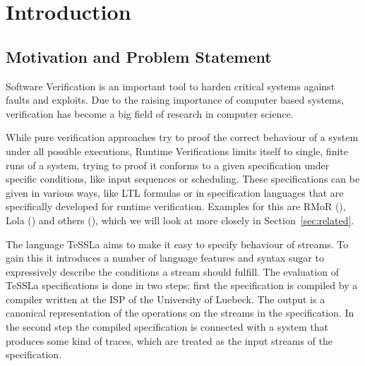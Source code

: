 %
\chapter{Introduction}
\label{sec:intro}


\section{Motivation and Problem Statement}
\label{sec:intro:motivation}

Software Verification is an important tool to harden critical systems against faults and exploits.
Due to the raising importance of computer based systems, verification has become a big field of research in computer science.

While pure verification approaches try to proof the correct behaviour of a system under all possible executions,
Runtime Verifications limits itself to single, finite runs of a system, trying to proof it conforms to a given specification
under specific conditions, like input sequences or scheduling.
These specifications can be given in various ways, like LTL formulas or in specification languages that are specifically developed for
runtime verification.
Examples for this are RMoR (\citep{Havelund2008}), Lola (\citep{DAngelo2005}) and others (\citep{Zheng2015, Pike2010, Mostafa2015}), which we will look at more closely in Section~\ref{sec:related}.

The language TeSSLa aims to make it easy to specify behaviour of streams.
To gain this it introduces a number of language features and syntax sugar to expressively describe the conditions a stream should fulfill.
The evaluation of TeSSLa specifications is done in two steps: first the specification is compiled by a compiler written at the ISP of the University of Luebeck.
The output is a canonical representation of the operations on the streams in the specification.
In the second step the compiled specification is connected with a system that produces some kind of traces, which are treated as the input streams of the specification.

